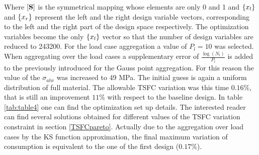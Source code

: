  Where $\left[{\mathbf{S}}\right]$ is the symmetrical mapping whose elements are only 0 and 1 and $\left\lbrace{x_l}\right \rbrace$ and $\left\lbrace{x_r}\right \rbrace$ represent the left and the right design variable vectors, corresponding to the left and the right part of the design space respectively.  The optimization variables become the only $\left\lbrace{x_l}\right \rbrace$ vector so that the number of design variables are reduced to 243200. For the load case aggregation a value of $P_l=10$ was selected.  When aggregating over the load cases a supplementary error of $\frac{\log(N_l)}{P_l}$ is added to the previously introduced for the Gauss point aggregation. For this reason the value of the $\sigma_{alw}$ was increased to 49 MPa. The initial guess is again a uniform distribution of full material. The allowable TSFC variation was this time $0.16 \%$, that is still an improvement  $11 \%$ with respect to the baseline design.  In table \ref{tab:table4} one can find the optimization set up details. The interested reader can find several solutions obtained for different values of the TSFC variation constraint in section \ref{TSFCpareto}. Actually due to the aggregation over load cases by the KS function approximation, the final maximum variation of consumption is equivalent to the one of the first design ($0.17 \%$).
  

